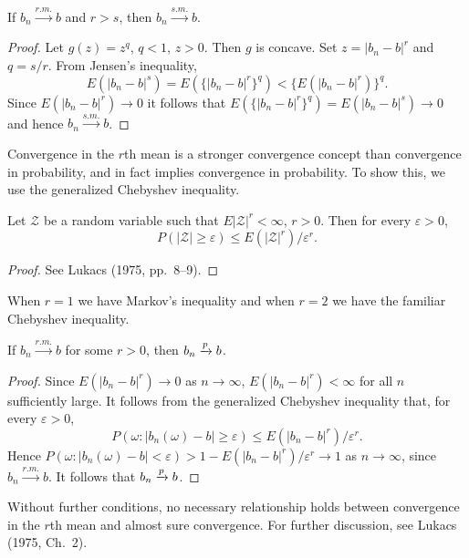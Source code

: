 \begin{theorem}\label{thm:rm-implies-sm}
If $b_n \xrightarrow{r.m.} b$ and $r > s$, then $b_n \xrightarrow{s.m.} b$.
\end{theorem}

\begin{proof}
Let $g(z) = z^q$, $q < 1$, $z > 0$. Then $g$ is concave. Set $z = |b_n - b|^r$
and $q = s/r$. From Jensen's inequality,
\[
E(|b_n - b|^s) = E(\{|b_n - b|^r\}^q) < \{E(|b_n - b|^r)\}^q.
\]
Since $E(|b_n - b|^r) \to 0$ it follows that $E(\{|b_n - b|^r\}^q) = E(|b_n - b|^s) \to 0$
and hence $b_n \xrightarrow{s.m.} b$.
\end{proof}

Convergence in the $r$th mean is a stronger convergence concept than
convergence in probability, and in fact implies convergence in probability.
To show this, we use the generalized Chebyshev inequality.

\begin{proposition}\label{prop:chebyshev}
Let $\mathcal{Z}$ be a
random variable such that $E|\mathcal{Z}|^r < \infty$, $r > 0$. Then for every $\varepsilon > 0$,
\[
P(|\mathcal{Z}| \geq \varepsilon) \leq E(|\mathcal{Z}|^r)/\varepsilon^r.
\]
\end{proposition}

\begin{proof}
See Lukacs (1975, pp.\ 8--9).
\end{proof}

When $r = 1$ we have Markov's inequality and when $r = 2$ we have the
familiar Chebyshev inequality.

\begin{theorem}\label{thm:rm-implies-p}
If $b_n \xrightarrow{r.m.} b$ for some $r > 0$, then $b_n \xrightarrow{p} b$.
\end{theorem}

\begin{proof}
Since $E(|b_n - b|^r) \to 0$ as $n \to \infty$, $E(|b_n - b|^r) < \infty$ for all $n$
sufficiently large. It follows from the generalized Chebyshev inequality that,
for every $\varepsilon > 0$,
\[
P(\omega : |b_n(\omega) - b| \geq \varepsilon) \leq E(|b_n - b|^r)/\varepsilon^r.
\]
Hence $P(\omega : |b_n(\omega) - b| < \varepsilon) > 1 - E(|b_n - b|^r)/\varepsilon^r \to 1$ as $n \to \infty$, since
$b_n \xrightarrow{r.m.} b$. It follows that $b_n \xrightarrow{p} b$.
\end{proof}

Without further conditions, no necessary relationship holds between convergence in the $r$th mean and almost sure convergence. For further discussion, see Lukacs (1975, Ch.\ 2).

